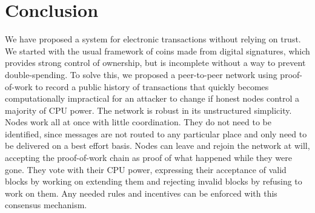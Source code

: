 \documentclass[10pt]{book}
\begin{document}
\part*{Conclusion}
We have proposed a system for electronic transactions without relying on trust.
We started with the usual framework of coins made from digital signatures, which provides strong control of ownership, but is incomplete without a way to prevent double-spending.
To solve this, we proposed a peer-to-peer network using proof-of-work to record a public history of transactions that quickly becomes computationally impractical for an attacker to change if honest nodes control a majority of CPU power.
The network is robust in its unstructured simplicity.
Nodes work all at once with little coordination.
They do not need to be identified, since messages are not routed to any particular place and only need to be delivered on a best effort basis.
Nodes can leave and rejoin the network at will, accepting the proof-of-work chain as proof of what happened while they were gone.
They vote with their CPU power, expressing their acceptance of valid blocks by working on extending them and rejecting invalid blocks by refusing to work on them.
Any needed rules and incentives can be enforced with this consensus mechanism.



\end{document}
